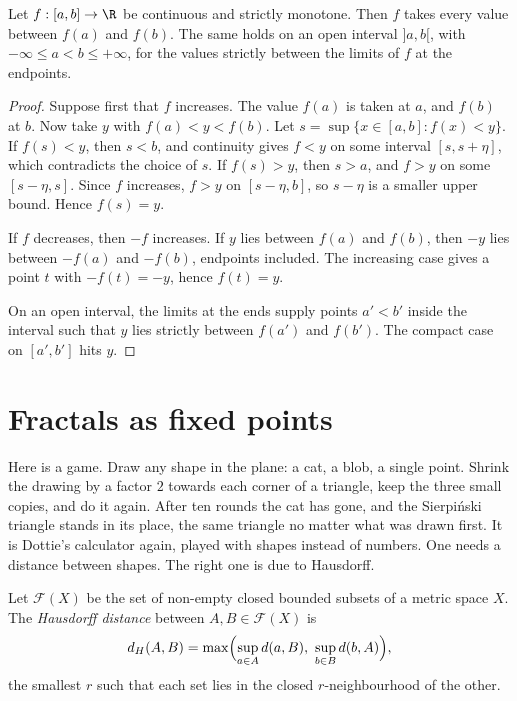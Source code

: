 \begin{lemma}\label{lem:monoivt}
Let $f:[a,b]\to\R$ be continuous and strictly monotone. Then $f$ takes every value between $f(a)$ and $f(b)$. The same holds on an open interval $]a,b[$, with $-\infty\le a<b\le+\infty$, for the values strictly between the limits of $f$ at the endpoints.
\end{lemma}
\begin{proof}
Suppose first that $f$ increases. The value $f(a)$ is taken at $a$, and $f(b)$ at $b$. Now take $y$ with $f(a)<y<f(b)$. Let $s=\sup\{x\in[a,b]:f(x)<y\}$. If $f(s)<y$, then $s<b$, and continuity gives $f<y$ on some interval $[s,s+\eta]$, which contradicts the choice of $s$. If $f(s)>y$, then $s>a$, and $f>y$ on some $[s-\eta,s]$. Since $f$ increases, $f>y$ on $[s-\eta,b]$, so $s-\eta$ is a smaller upper bound. Hence $f(s)=y$.

If $f$ decreases, then $-f$ increases. If $y$ lies between $f(a)$ and $f(b)$, then $-y$ lies between $-f(a)$ and $-f(b)$, endpoints included. The increasing case gives a point $t$ with $-f(t)=-y$, hence $f(t)=y$.

On an open interval, the limits at the ends supply points $a'<b'$ inside the interval such that $y$ lies strictly between $f(a')$ and $f(b')$. The compact case on $[a',b']$ hits $y$.
\end{proof}

\section{Fractals as fixed points}

Here is a game. Draw any shape in the plane: a cat, a blob, a single point. Shrink the drawing by a factor $2$ towards each corner of a triangle, keep the three small copies, and do it again. After ten rounds the cat has gone, and the Sierpi\'nski triangle stands in its place, the same triangle no matter what was drawn first. It is Dottie's calculator again, played with shapes instead of numbers. One needs a distance between shapes. The right one is due to Hausdorff.

\begin{definition}
Let $\mathcal F(X)$ be the set of non-empty closed bounded subsets of a metric space $X$. The \emph{Hausdorff distance} between $A,B\in\mathcal F(X)$ is
\[
d_H(A,B)=\max\Bigl(\sup_{a\in A}d(a,B),\ \sup_{b\in B}d(b,A)\Bigr),
\]
the smallest $r$ such that each set lies in the closed $r$-neighbourhood of the other.
\end{definition}

